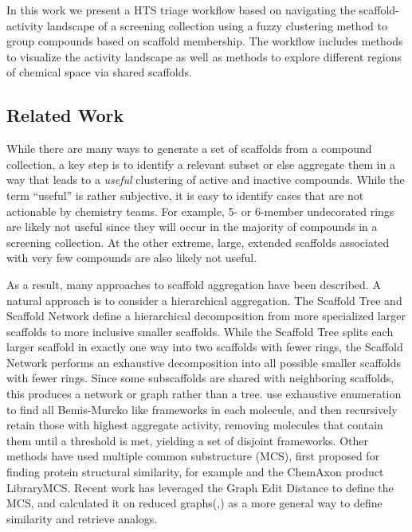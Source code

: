 \documentclass[journal=jacsat,biochem,manuscript=article]{achemso}
\begin{document}
In this work we present a HTS triage workflow based on navigating the
scaffold-activity landscape of a screening collection using a fuzzy
clustering method to group compounds based on scaffold membership. The
workflow includes methods to visualize the activity landscape as well
as methods to explore different regions of chemical space via shared
scaffolds. 

\subsection{Related Work}
While there are many ways to generate a set of scaffolds from a
compound collection, a key step is to identify a relevant subset or else aggregate them in a way that leads to a {\it useful} clustering
of active and inactive compounds. While the term ``useful'' is rather
subjective, it is easy to identify cases that are not actionable by chemistry teams.
For example, 5- or 6-member undecorated rings are likely not useful since they will
occur in the majority of compounds in a screening collection. At the
other extreme, large, extended scaffolds associated with very
few compounds are also likely not useful.

As a result, many approaches to scaffold aggregation have been
described. A natural approach is to consider a hierarchical
aggregation. The Scaffold Tree\cite{Ertl2011ScaffoldTree} and Scaffold
Network\cite{Varin2011ScafNet} define a hierarchical decomposition
from more specialized larger scaffolds to more inclusive smaller
scaffolds. While the Scaffold Tree splits each larger scaffold in
exactly one way into two scaffolds with fewer rings, the Scaffold
Network performs an exhaustive decomposition into all possible smaller
scaffolds with fewer rings.  Since some subscaffolds are shared with
neighboring scaffolds, this produces a network or graph rather than a
tree.  \citet{Harper2004DDclus} use exhaustive enumeration to
find all Bemis-Murcko like frameworks in each molecule, and then
recursively retain those with highest aggregate activity,
removing molecules that contain them until a threshold is met,
yielding a set of disjoint frameworks.  Other methods have used
multiple common substructure (MCS), first proposed for finding protein
structural similarity\cite{Koch1997MCSprot}, for example
\citet{Quintus2009MCS} and the ChemAxon product LibraryMCS. Recent work
has leveraged the Graph Edit Distance to define the MCS\cite{SmallWorld},
and calculated it on reduced graphs(\cite{GH2019GED},\cite{Harper2004DDclus})
as a more general way to define similarity and retrieve analogs.  
\end{document}

